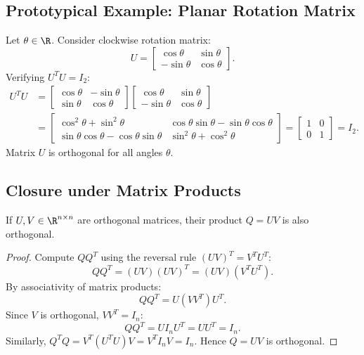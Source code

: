 \subsection{Prototypical Example: Planar Rotation Matrix}

\begin{example}
Let $\theta \in \R$. Consider clockwise rotation matrix:
\begin{equation}
    U = \begin{bmatrix} \cos\theta & \sin\theta \\ -\sin\theta & \cos\theta \end{bmatrix}.
\end{equation}
Verifying $U^T U = I_2$:
\begin{align}
    U^T U &= \begin{bmatrix} \cos\theta & -\sin\theta \\ \sin\theta & \cos\theta \end{bmatrix} \begin{bmatrix} \cos\theta & \sin\theta \\ -\sin\theta & \cos\theta \end{bmatrix} \nonumber \\
    &= \begin{bmatrix}
        \cos^2\theta + \sin^2\theta & \cos\theta\sin\theta - \sin\theta\cos\theta \\
        \sin\theta\cos\theta - \cos\theta\sin\theta & \sin^2\theta + \cos^2\theta
    \end{bmatrix} = \begin{bmatrix} 1 & 0 \\ 0 & 1 \end{bmatrix} = I_2.
\end{align}
Matrix $U$ is orthogonal for all angles $\theta$.
\end{example}

\subsection{Closure under Matrix Products}

\begin{proposition}
If $U, V \in \R^{n \times n}$ are orthogonal matrices, their product $Q = UV$ is also orthogonal.
\end{proposition}

\begin{proof}
Compute $Q Q^T$ using the reversal rule $(UV)^T = V^T U^T$:
\begin{equation}
    Q Q^T = (UV)(UV)^T = (UV)(V^T U^T).
\end{equation}
By associativity of matrix products:
\begin{equation}
    Q Q^T = U (V V^T) U^T.
\end{equation}
Since $V$ is orthogonal, $V V^T = I_n$:
\begin{equation}
    Q Q^T = U I_n U^T = U U^T = I_n.
\end{equation}
Similarly, $Q^T Q = V^T (U^T U) V = V^T I_n V = I_n$. Hence $Q = UV$ is orthogonal.
\end{proof}

